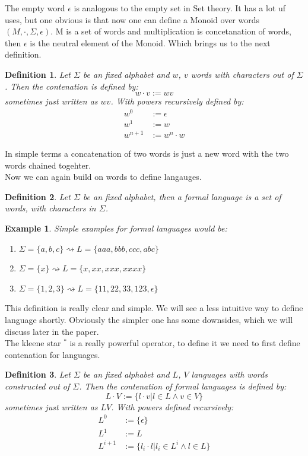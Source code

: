 \documentclass[12pt,letterpaper]{article}
\newtheorem{definition}{Definition}
\newtheorem{example}{Example}[section]
\begin{document}
The empty word $\epsilon$ is analogous to the empty set in Set theory.
It has a lot uf uses, but one obvious is that now one can define 
a Monoid over words $(M, \cdot, \Sigma, \epsilon)$.
M is a set of words and multiplication is concetanation of words, then 
$\epsilon$ is the neutral element of the Monoid. Which brings us to
the next definition.
\begin{definition}
  Let $\Sigma$ be an fixed alphabet and  $w$, $v$ words with 
  characters out of $\Sigma$. Then the contenation is defined by:
  \[ w \cdot v := wv\]
  sometimes just written as $wv$. With powers recursively defined by:
  \begin{align*}
    w^0 &:= \epsilon\\
    w^1 &:= w\\
    w^{n+1} &:= w^n\cdot w
  \end{align*}
\end{definition}
In simple terms a concatenation of two words is just a new word with 
the two words chained togehter.\\
Now we can again build on words to define langauges.
\begin{definition}
  Let $\Sigma$ be an fixed alphabet, then a formal language is a 
  set of words, with characters in $\Sigma$.
\end{definition}
\begin{example}
  Simple examples for formal languages would be:
  \begin{enumerate}
    \item $\Sigma = \{a,b,c\} \rightsquigarrow L = \{aaa, bbb, ccc, abc\}$
    \item $\Sigma = \{x\} \rightsquigarrow L = \{ x, xx, xxx, xxxx\}$
    \item $\Sigma = \{1,2,3\} \rightsquigarrow L = \{11, 22, 33, 123,\epsilon\}$
  \end{enumerate}
\end{example}
This definition is really clear and simple. We will see a less intuitive way to
define language shortly. Obviously the simpler one has some downsides, 
which we will discuss later in the paper. \\
The kleene star $^*$ is a really powerful operator, to define it we need
to first define contenation for languages.
\begin{definition}
  Let $\Sigma$ be an fixed alphabet and  $L$, $V$ languages with 
  words constructed out of $\Sigma$.
  Then the contenation of formal languages is defined by:
  \[ L \cdot V := \{ l \cdot v | l \in L \land v \in V \}\]
  sometimes just written as $LV$. With powers defined recursively:
  \begin{align*}
      L^0 & := \{\epsilon \}\\
      L^1 & := L  \\
      L^{i+1} & := \{ l_i\cdot l | l_i \in L^i \land l \in L\}
  \end{align*}
\end{definition}
\end{document}
